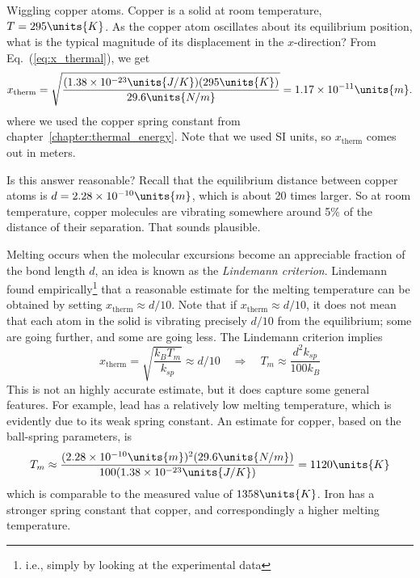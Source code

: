 \begin{example}{Wiggling copper atoms.}
  Copper is a solid at room temperature, $T=295\units{K}$.  As the
  copper atom oscillates about its equilibrium position, what is the
  typical magnitude of its displacement in the $x$-direction?
  \solution From Eq.~(\ref{eq:x_thermal}), we get
\begin{equation}
x_\text{therm} = \sqrt{\frac{(1.38\times 10^{-23}\units{J/K})(295\units{K})}
{29.6\units{N/m}}} =  1.17\times 10^{-11}\units{m}.
\end{equation}
where we used the copper spring constant from
chapter~\ref{chapter:thermal_energy}.  Note that we used SI
units, so $x_\text{therm}$ comes out in meters.  

Is this answer reasonable?  Recall that the equilibrium distance
between copper atoms is $d=2.28\times 10^{-10}\units{m}$, which is
about 20 times larger.  So at room temperature, copper molecules are
vibrating somewhere around 5\% of the distance of their separation.
That sounds plausible.  \end{example}

Melting occurs when the molecular excursions become an appreciable
fraction of the bond length $d$, an idea is known as the {\it
  Lindemann criterion}.  Lindemann found empirically\footnote{i.e.,
simply by looking at the experimental data} that a reasonable estimate
for the melting temperature can be obtained by setting $x_\text{therm}
\approx d/10$.  Note that if $x_\text{therm} \approx d/10$, it does
not mean that each atom in the solid is vibrating precisely $d/10$
from the equilibrium; some are going further, and some are going less.
The Lindemann criterion implies
\begin{equation}
x_\text{therm} = \sqrt{\frac{k_BT_m}{k_{sp}}} \approx d/10 \quad\Rightarrow\quad
T_m \approx \frac{d^2k_{sp}}{100 k_B}
\end{equation}
This is not an highly accurate estimate, but it does capture some
general features.  For example, lead has a relatively low melting
temperature, which is evidently due to its weak spring constant.
An estimate for copper, based on the ball-spring parameters, is
\begin{equation}
T_{m} \approx \frac{(2.28\times 10^{-10}\units{m})^2(29.6\units{N/m})}
{100(1.38\times 10^{-23}\units{J/K})} = 1120\units{K}
\end{equation}
which is comparable to the measured value of $1358\units{K}$.  Iron
has a stronger spring constant that copper, and correspondingly a 
higher melting temperature.

